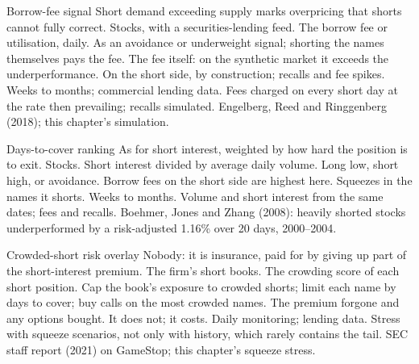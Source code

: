 \begin{strategyfile}{Borrow-fee signal}\label{strat:s1:short-interest-borrow-and-crowding:fee}
 Short demand exceeding supply marks overpricing that shorts cannot fully correct.
 Stocks, with a securities-lending feed.
 The borrow fee or utilisation, daily.
 As an avoidance or underweight signal; shorting the names themselves pays the fee.
 The fee itself: on the synthetic market it exceeds the underperformance.
 On the short side, by construction; recalls and fee spikes.
 Weeks to months; commercial lending data.
 Fees charged on every short day at the rate then prevailing; recalls simulated.
 Engelberg, Reed and Ringgenberg (2018); this chapter's simulation.
\end{strategyfile}

\begin{strategyfile}{Days-to-cover ranking}\label{strat:s1:short-interest-borrow-and-crowding:dtc}
 As for short interest, weighted by how hard the position is to exit.
 Stocks.
 Short interest divided by average daily volume.
 Long low, short high, or avoidance.
 Borrow fees on the short side are highest here.
 Squeezes in the names it shorts.
 Weeks to months.
 Volume and short interest from the same dates; fees and recalls.
 Boehmer, Jones and Zhang (2008): heavily shorted stocks underperformed by a risk-adjusted 1.16\% over 20 days, 2000--2004.
\end{strategyfile}

\begin{strategyfile}{Crowded-short risk overlay}\label{strat:s1:short-interest-borrow-and-crowding:overlay}
 Nobody: it is insurance, paid for by giving up part of the short-interest premium.
 The firm's short books.
 The crowding score of each short position.
 Cap the book's exposure to crowded shorts; limit each name by days to cover; buy calls on the most crowded names.
 The premium forgone and any options bought.
 It does not; it costs.
 Daily monitoring; lending data.
 Stress with squeeze scenarios, not only with history, which rarely contains the tail.
 SEC staff report (2021) on GameStop; this chapter's squeeze stress.
\end{strategyfile}

